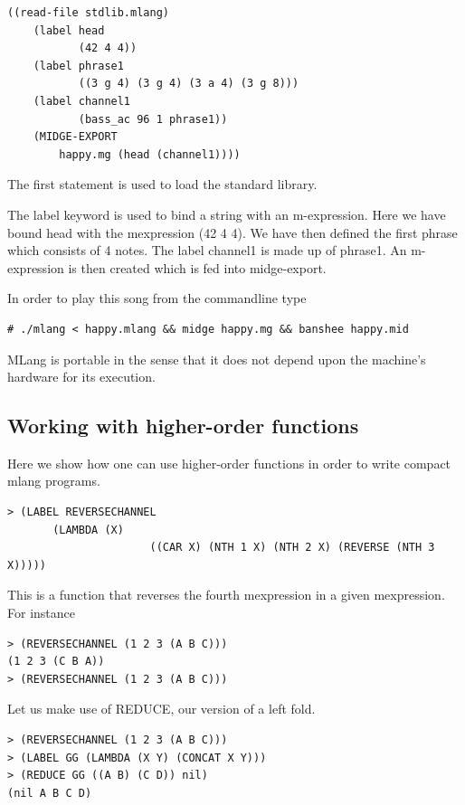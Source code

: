 \documentclass[letterpaper,11pt]{article}
\begin{document}
{\lstset{breaklines=true,language=Lisp}
\begin{lstlisting}
((read-file stdlib.mlang)
	(label head
	       (42 4 4))
	(label phrase1
	       ((3 g 4) (3 g 4) (3 a 4) (3 g 8)))
	(label channel1
	       (bass_ac 96 1 phrase1))
	(MIDGE-EXPORT
		happy.mg (head (channel1))))
\end{lstlisting}

The first statement is used to load the standard library.

The label keyword is used to bind a string with an m-expression. Here we have bound head with the mexpression (42 4 4).
We have then defined the first phrase which consists of 4 notes. The label channel1 is made up of phrase1. An m-expression is then created
which is fed into midge-export.

In order to play this song from the commandline type
\lstset{breaklines=true,language=bash}
\begin{lstlisting}
# ./mlang < happy.mlang && midge happy.mg && banshee happy.mid
\end{lstlisting}

MLang is portable in the sense that it does not depend upon the machine’s hardware for its execution.

\subsection{Working with higher-order functions}


Here we show how one can use higher-order functions in order to write compact mlang programs.

\lstset{breaklines=true,language=Lisp}
\begin{lstlisting}
> (LABEL REVERSECHANNEL
       (LAMBDA (X)
                      ((CAR X) (NTH 1 X) (NTH 2 X) (REVERSE (NTH 3 X)))))

\end{lstlisting}
This is a function that reverses the fourth mexpression in a given mexpression. For instance

\lstset{breaklines=true,language=Lisp}
\begin{lstlisting}
> (REVERSECHANNEL (1 2 3 (A B C)))
(1 2 3 (C B A))
> (REVERSECHANNEL (1 2 3 (A B C)))
\end{lstlisting}
Let us make use of REDUCE, our version of a left fold.

\lstset{breaklines=true,language=Lisp}
\begin{lstlisting}
> (REVERSECHANNEL (1 2 3 (A B C)))
> (LABEL GG (LAMBDA (X Y) (CONCAT X Y)))
> (REDUCE GG ((A B) (C D)) nil)
(nil A B C D)


\end{lstlisting}}
\end{document}
